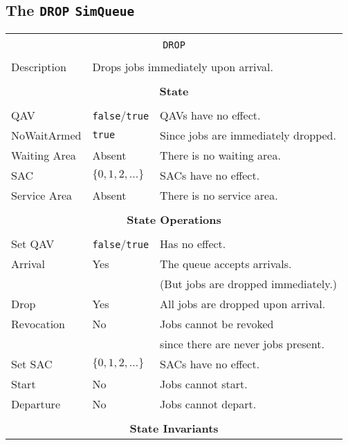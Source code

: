 \documentclass[12pt]{book}
\begin{document}
\subsection{The \lstinline{DROP} \lstinline{SimQueue}}

\begin{tabular}{|l|l|l|}
\hline
\multicolumn{3}{|c|}{} \\
\multicolumn{3}{|c|}{\lstinline[basicstyle=\large]{DROP}} \\
\multicolumn{3}{|c|}{} \\
\hline
Description & \multicolumn{2}{|l|}{Drops jobs immediately upon arrival.} \\
\hline
\multicolumn{3}{|c|}{} \\
\multicolumn{3}{|c|}{\bf State} \\
\multicolumn{3}{|c|}{} \\
\hline
QAV & \lstinline|false|/\lstinline|true| & QAVs have no effect. \\
\hline
NoWaitArmed & \lstinline|true| & Since jobs are immediately dropped. \\
\hline
Waiting Area & Absent & There is no waiting area. \\
\hline
SAC & $\{0, 1, 2, \ldots\}$ & SACs have no effect. \\
\hline
Service Area & Absent & There is no service area. \\
\hline
\multicolumn{3}{|c|}{} \\
\multicolumn{3}{|c|}{\bf State Operations} \\
\multicolumn{3}{|c|}{} \\
\hline
Set QAV & \lstinline|false|/\lstinline|true| & Has no effect. \\
\hline
Arrival & Yes & The queue accepts arrivals. \\
        &     & (But jobs are dropped immediately.) \\
\hline
Drop & Yes & All jobs are dropped upon arrival. \\
\hline
Revocation & No & Jobs cannot be revoked \\
           &    & since there are never jobs present. \\
\hline
Set SAC & $\{0, 1, 2, \ldots\}$ & SACs have no effect. \\
\hline
Start & No & Jobs cannot start. \\
\hline
Departure & No & Jobs cannot depart. \\
\hline
\multicolumn{3}{|c|}{} \\
\multicolumn{3}{|c|}{\bf State  Invariants} \\

\end{tabular}
\end{document}

